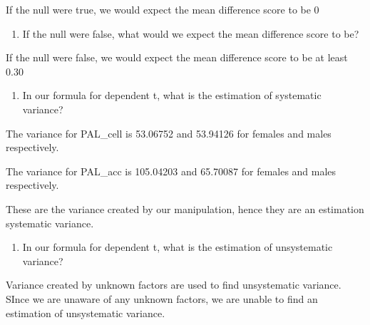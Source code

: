 \documentclass[
]{article}
\providecommand{\tightlist}{%
  \setlength{\itemsep}{0pt}\setlength{\parskip}{0pt}}
\begin{document}
If the null were true, we would expect the mean difference score to be 0

\begin{enumerate}
\def\labelenumi{\arabic{enumi})}
\setcounter{enumi}{13}
\tightlist
\item
  If the null were false, what would we expect the mean difference score
  to be?
\end{enumerate}

If the null were false, we would expect the mean difference score to be
at least 0.30

\begin{enumerate}
\def\labelenumi{\arabic{enumi})}
\setcounter{enumi}{14}
\tightlist
\item
  In our formula for dependent t, what is the estimation of systematic
  variance?
\end{enumerate}

The variance for PAL\_cell is 53.06752 and 53.94126 for females and
males respectively.

The variance for PAL\_acc is 105.04203 and 65.70087 for females and
males respectively.

These are the variance created by our manipulation, hence they are an
estimation systematic variance.

\begin{enumerate}
\def\labelenumi{\arabic{enumi})}
\setcounter{enumi}{15}
\tightlist
\item
  In our formula for dependent t, what is the estimation of unsystematic
  variance?
\end{enumerate}

Variance created by unknown factors are used to find unsystematic
variance. SInce we are unaware of any unknown factors, we are unable to
find an estimation of unsystematic variance.
\end{document}
